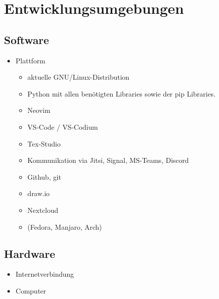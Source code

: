 \chapter{Entwicklungsumgebungen}

\section{Software}

\begin{itemize}
	\item Plattform
		\begin{itemize}
			\item aktuelle GNU/Linux-Distribution
			\item Python mit allen benötigten Libraries sowie der pip Libraries.
		\end{itemize}

		\begin{itemize}
			\item Neovim
			\item VS-Code / VS-Codium
			\item Tex-Studio
			\item Kommunikation via Jitsi, Signal, MS-Teams, Discord
			\item Github, git
			\item draw.io
			\item Nextcloud
			\item \Linux (Fedora, Manjaro, Arch)
		\end{itemize}
\end{itemize}

\section{Hardware}

\begin{itemize}
	\item Internetverbindung
	\item Computer
\end{itemize}
